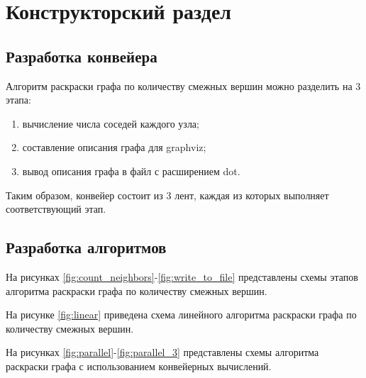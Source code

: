 \section{Конструкторский раздел \hfill}
\vspace{\baselineskip}

\subsection{Разработка конвейера}

Алгоритм раскраски графа по количеству смежных вершин можно разделить на 3 этапа:
\begin{enumerate}
    \item вычисление числа соседей каждого узла;
    \item составление описания графа для graphviz;
    \item вывод описания графа в файл с расширением dot.
\end{enumerate}

Таким образом, конвейер состоит из 3 лент, каждая из которых выполняет соответствующий этап. 

\subsection{Разработка алгоритмов}

На рисунках \ref{fig:count_neighbors}-\ref{fig:write_to_file} представлены схемы этапов алгоритма раскраски графа по количеству смежных вершин. 

На рисунке \ref{fig:linear} приведена схема линейного алгоритма раскраски графа по количеству смежных вершин.

На рисунках \ref{fig:parallel}-\ref{fig:parallel_3} представлены схемы алгоритма раскраски графа с использованием конвейерных вычислений.

\clearpage

